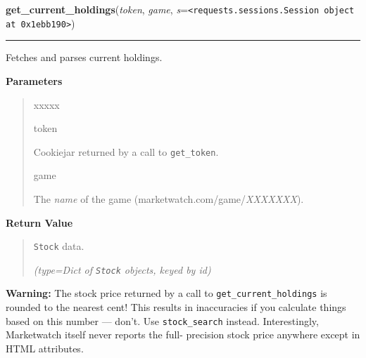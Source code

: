 \hspace{.8\funcindent}\begin{boxedminipage}{\funcwidth}

    \raggedright \textbf{get\_current\_holdings}(\textit{token}, \textit{game}, \textit{s}={\tt {\textless}requests.sessions.Session object at 0x1ebb190{\textgreater}})

    \vspace{-1.5ex}

    \rule{\textwidth}{0.5\fboxrule}
\setlength{\parskip}{2ex}
    Fetches and parses current holdings.

\setlength{\parskip}{1ex}
      \textbf{Parameters}
      \vspace{-1ex}

      \begin{quote}
        \begin{Ventry}{xxxxx}

          \item[token]

          Cookiejar returned by a call to \texttt{get\_token}.

          \item[game]

          The \textit{name} of the game 
          (marketwatch.com/game/\textit{XXXXXXX}).

        \end{Ventry}

      \end{quote}

      \textbf{Return Value}
    \vspace{-1ex}

      \begin{quote}
      \texttt{Stock} data.

      {\it (type=Dict of \texttt{Stock} objects, keyed by \textit{id})}

      \end{quote}

\textbf{Warning:} The stock price returned by a call to \texttt{get\_current\_holdings} is 
rounded to the nearest cent! This results in inaccuracies if you calculate 
things based on this number --- don't. Use \texttt{stock\_search} instead. 
Interestingly, Marketwatch itself never reports the full- precision stock 
price anywhere except in HTML attributes.



    \end{boxedminipage}

